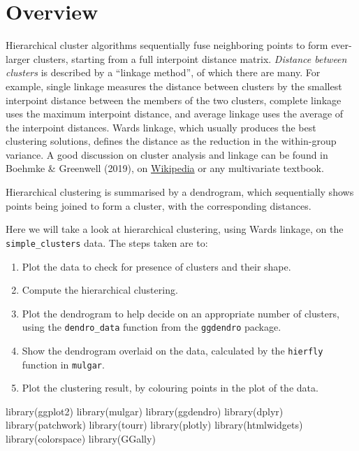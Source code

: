 \documentclass[
  letterpaper,
]{book}
\newenvironment{Shaded}{\begin{snugshade}}{\end{snugshade}}
\newcommand{\FunctionTok}[1]{\textcolor[rgb]{0.28,0.35,0.67}{#1}}
\newcommand{\NormalTok}[1]{\textcolor[rgb]{0.00,0.23,0.31}{#1}}
\providecommand{\tightlist}{%
  \setlength{\itemsep}{0pt}\setlength{\parskip}{0pt}}\usepackage{longtable,booktabs,array}
\begin{document}
\hypertarget{overview-1}{%
\section{Overview}\label{overview-1}}

Hierarchical cluster algorithms sequentially fuse neighboring points to
form ever-larger clusters, starting from a full interpoint distance
matrix. \emph{Distance between clusters} is described by a ``linkage
method'', of which there are many. For example, single linkage measures
the distance between clusters by the smallest interpoint distance
between the members of the two clusters, complete linkage uses the
maximum interpoint distance, and average linkage uses the average of the
interpoint distances. Wards linkage, which usually produces the best
clustering solutions, defines the distance as the reduction in the
within-group variance. A good discussion on cluster analysis and linkage
can be found in Boehmke \& Greenwell (2019), on
\href{https://en.wikipedia.org/wiki/Cluster_analysis}{Wikipedia} or any
multivariate textbook.

Hierarchical clustering is summarised by a dendrogram, which
sequentially shows points being joined to form a cluster, with the
corresponding distances.

Here we will take a look at hierarchical clustering, using Wards
linkage, on the \texttt{simple\_clusters} data. The steps taken are to:

\begin{enumerate}
\def\labelenumi{\arabic{enumi}.}
\tightlist
\item
  Plot the data to check for presence of clusters and their shape.
\item
  Compute the hierarchical clustering.
\item
  Plot the dendrogram to help decide on an appropriate number of
  clusters, using the \texttt{dendro\_data} function from the
  \texttt{ggdendro} package.
\item
  Show the dendrogram overlaid on the data, calculated by the
  \texttt{hierfly} function in \texttt{mulgar}.
\item
  Plot the clustering result, by colouring points in the plot of the
  data.
\end{enumerate}


\begin{Shaded}
\begin{Highlighting}[]
\FunctionTok{library}\NormalTok{(ggplot2)}
\FunctionTok{library}\NormalTok{(mulgar)}
\FunctionTok{library}\NormalTok{(ggdendro)}
\FunctionTok{library}\NormalTok{(dplyr)}
\FunctionTok{library}\NormalTok{(patchwork)}
\FunctionTok{library}\NormalTok{(tourr)}
\FunctionTok{library}\NormalTok{(plotly)}
\FunctionTok{library}\NormalTok{(htmlwidgets)}
\FunctionTok{library}\NormalTok{(colorspace)}
\FunctionTok{library}\NormalTok{(GGally)}
\end{Highlighting}
\end{Shaded}
\end{document}

